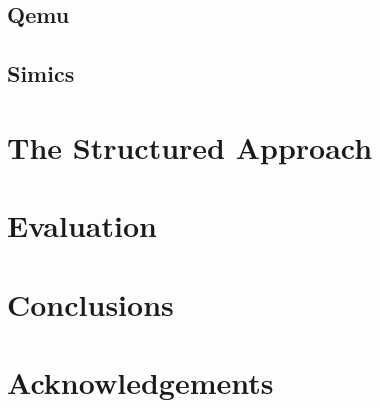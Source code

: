 \documentclass[a4paper,10pt,oneside,unicode]{article}
\begin{document}
\subsection{Qemu}

\subsection{Simics}

\section{The Structured Approach}

\section{Evaluation}

\section{Conclusions}

\section{Acknowledgements}


\end{document}
